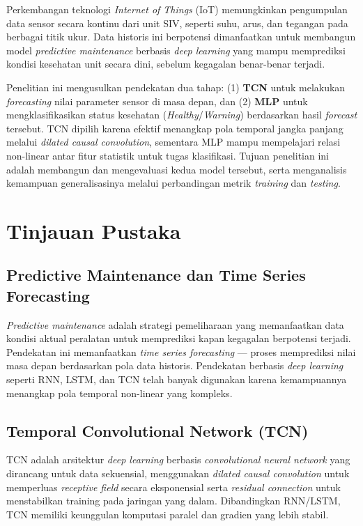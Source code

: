 \documentclass[11pt,a4paper]{article}
\begin{document}
Perkembangan teknologi \textit{Internet of Things} (IoT) memungkinkan pengumpulan data sensor secara kontinu dari unit SIV, seperti suhu, arus, dan tegangan pada berbagai titik ukur. Data historis ini berpotensi dimanfaatkan untuk membangun model \textit{predictive maintenance} berbasis \textit{deep learning} yang mampu memprediksi kondisi kesehatan unit secara dini, sebelum kegagalan benar-benar terjadi.

Penelitian ini mengusulkan pendekatan dua tahap: (1) \textbf{TCN} untuk melakukan \textit{forecasting} nilai parameter sensor di masa depan, dan (2) \textbf{MLP} untuk mengklasifikasikan status kesehatan (\textit{Healthy}/\textit{Warning}) berdasarkan hasil \textit{forecast} tersebut. TCN dipilih karena efektif menangkap pola temporal jangka panjang melalui \textit{dilated causal convolution}, sementara MLP mampu mempelajari relasi non-linear antar fitur statistik untuk tugas klasifikasi. Tujuan penelitian ini adalah membangun dan mengevaluasi kedua model tersebut, serta menganalisis kemampuan generalisasinya melalui perbandingan metrik \textit{training} dan \textit{testing}.

\section{Tinjauan Pustaka}

\subsection{Predictive Maintenance dan Time Series Forecasting}
\textit{Predictive maintenance} adalah strategi pemeliharaan yang memanfaatkan data kondisi aktual peralatan untuk memprediksi kapan kegagalan berpotensi terjadi. Pendekatan ini memanfaatkan \textit{time series forecasting} — proses memprediksi nilai masa depan berdasarkan pola data historis. Pendekatan berbasis \textit{deep learning} seperti RNN, LSTM, dan TCN telah banyak digunakan karena kemampuannya menangkap pola temporal non-linear yang kompleks.

\subsection{Temporal Convolutional Network (TCN)}
TCN adalah arsitektur \textit{deep learning} berbasis \textit{convolutional neural network} yang dirancang untuk data sekuensial, menggunakan \textit{dilated causal convolution} untuk memperluas \textit{receptive field} secara eksponensial serta \textit{residual connection} untuk menstabilkan training pada jaringan yang dalam. Dibandingkan RNN/LSTM, TCN memiliki keunggulan komputasi paralel dan gradien yang lebih stabil.
\end{document}
